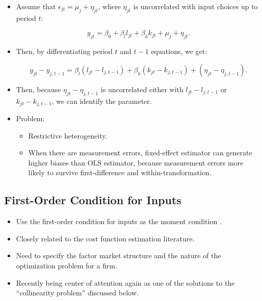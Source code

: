 \documentclass[]{book}
\providecommand{\tightlist}{%
  \setlength{\itemsep}{0pt}\setlength{\parskip}{0pt}}
\theoremstyle{definition}
\theoremstyle{definition}
\theoremstyle{definition}
\theoremstyle{remark}
\begin{document}
\begin{itemize}
\tightlist
\item
  Assume that \(\epsilon_{jt} = \mu_j + \eta_{jt}\), where \(\eta_{jt}\)
  is uncorrelated with input choices up to period \(t\):

  \begin{equation}
  y_{jt} = \beta_0 + \beta_l l_{jt} + \beta_k k_{jt} + \mu_j + \eta_{jt}.
  \end{equation}
\item
  Then, by differentiating period \(t\) and \(t - 1\) equations, we get:

  \begin{equation}
  y_{jt} - y_{j, t - 1}= \beta_l (l_{jt} - l_{j, t - 1}) + \beta_k (k_{jt} - k_{j, t - 1}) + (\eta_{jt} - \eta_{j, t - 1}).
  \end{equation}
\item
  Then, because \(\eta_{jt} - \eta_{j, t - 1}\) is uncorrelated either
  with \(l_{jt} - l_{j, t - 1}\) or \(k_{jt} - k_{j, t - 1}\), we can
  identify the parameter.
\item
  Problem:

  \begin{itemize}
  \tightlist
  \item
    Restrictive heterogeneity.
  \item
    When there are measurement errors, fixed-effect estimator can
    generate higher biases than OLS estimator, because measurement
    errors more likely to survive first-difference and
    within-transformation.
  \end{itemize}
\end{itemize}

\subsection{First-Order Condition for
Inputs}\label{first-order-condition-for-inputs}

\begin{itemize}
\tightlist
\item
  Use the first-order condition for inputs as the moment condition
  \citep{McElroy1987}.
\item
  Closely related to the cost function estimation literature.
\item
  Need to specify the factor market structure and the nature of the
  optimization problem for a firm.
\item
  Recently being center of attention again as one of the solutions to
  the ``collinearity problem'' discussed below.
\end{itemize}
\end{document}
